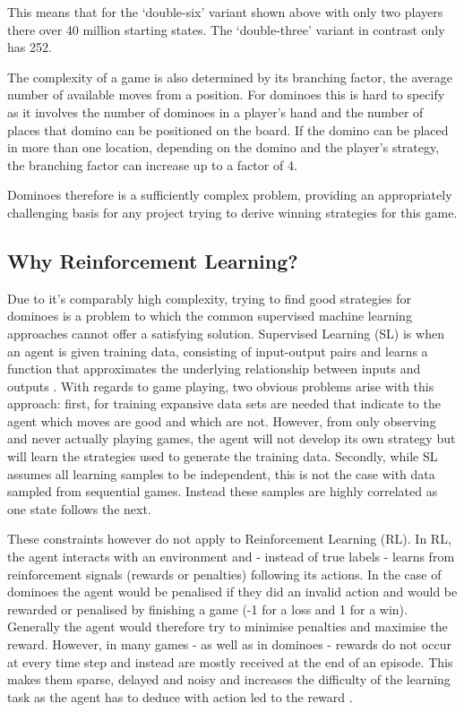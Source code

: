 \documentclass[12pt,a4paper]{article}
\begin{document}
This means that for the ‘double-six’ variant shown above with only two players there over 40 million starting states. The ‘double-three’ variant in contrast only has 252. 

The complexity of a game is also determined by its branching factor, the average number of available moves from a position. For dominoes this is hard to specify as it involves the number of dominoes in a player’s hand and the number of places that domino can be positioned on the board. If the domino can be placed in more than one location, depending on the domino and the player’s strategy, the branching factor can increase up to a factor of 4.

Dominoes therefore is a sufficiently complex problem, providing an appropriately challenging basis for any project trying to derive winning strategies for this game. 


\subsection{Why Reinforcement Learning?}
\label{sec:rl}
Due to it’s comparably high complexity, trying to find good strategies for dominoes is a problem to which the common supervised machine learning approaches cannot offer a satisfying solution. Supervised Learning (SL) is when an agent is given training data, consisting of input-output pairs and learns a function that approximates the underlying relationship between inputs and outputs  \citep{russell_artificial_2010}. With regards to game playing, two obvious problems arise with this approach: first, for training expansive data sets are needed that indicate to the agent which moves are good and which are not. However, from only observing and never actually playing games, the agent will not develop its own strategy but will learn the strategies used to generate the training data. Secondly, while SL assumes all learning samples to be independent, this is not the case with data sampled from sequential games. Instead these samples are highly correlated as one state follows the next. 

These constraints however do not apply to Reinforcement Learning (RL). In RL, the agent interacts with an environment and - instead of true labels - learns from reinforcement signals (rewards or penalties) following its actions. In the case of dominoes the agent would be penalised if they did an invalid action and would be rewarded or penalised by finishing a game (-1 for a loss and 1 for a win). Generally the agent would therefore try to minimise penalties and maximise the reward. However, in many games - as well as in dominoes - rewards do not occur at every time step and instead are mostly received at the end of an episode. This makes them sparse, delayed and noisy \citep{mnih_playing_2013} and increases the difficulty of the learning task as the agent has to deduce with action led to the reward \citep{francois-lavet_introduction_2018}.
\end{document}
